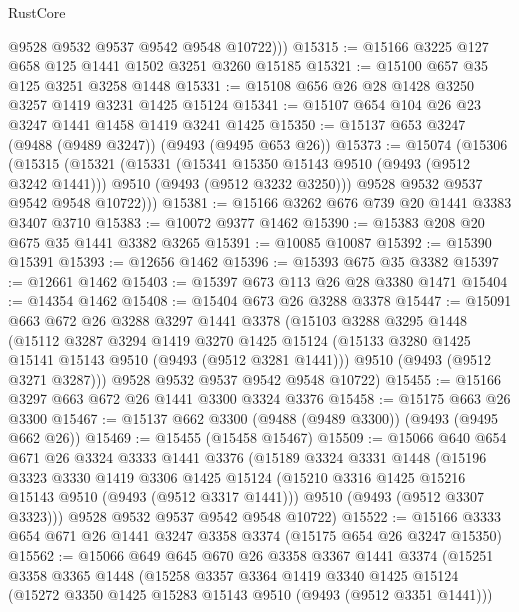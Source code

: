 \begin{lexlean}{RustCore}
\begin{coremodule}
          @9528
          @9532
          @9537
          @9542
          @9548
          @10722)))
@15315 := @15166 @3225 @127 @658 @125 @1441 @1502 @3251 @3260 @15185
@15321 := @15100 @657 @35 @125 @3251 @3258 @1448
@15331 := @15108 @656 @26 @28 @1428 @3250 @3257 @1419 @3231 @1425 @15124
@15341 := @15107 @654 @104 @26 @23 @3247 @1441 @1458 @1419 @3241 @1425
@15350 := @15137 @653 @3247 (@9488 (@9489 @3247)) (@9493 (@9495 @653 @26))
@15373 := @15074
    (@15306
      (@15315
        (@15321
          (@15331
            (@15341 @15350 @15143 @9510 (@9493 (@9512 @3242 @1441)))
            @9510
            (@9493 (@9512 @3232 @3250)))
          @9528
          @9532
          @9537
          @9542
          @9548
          @10722)))
@15381 := @15166 @3262 @676 @739 @20 @1441 @3383 @3407 @3710
@15383 := @10072 @9377 @1462
@15390 := @15383 @208 @20 @675 @35 @1441 @3382 @3265
@15391 := @10085 @10087
@15392 := @15390 @15391
@15393 := @12656 @1462
@15396 := @15393 @675 @35 @3382
@15397 := @12661 @1462
@15403 := @15397 @673 @113 @26 @28 @3380 @1471
@15404 := @14354 @1462
@15408 := @15404 @673 @26 @3288 @3378
@15447 := @15091
    @663
    @672
    @26
    @3288
    @3297
    @1441
    @3378
    (@15103
      @3288
      @3295
      @1448
      (@15112
        @3287
        @3294
        @1419
        @3270
        @1425
        @15124
        (@15133 @3280 @1425 @15141 @15143 @9510 (@9493 (@9512 @3281 @1441)))
        @9510
        (@9493 (@9512 @3271 @3287)))
      @9528
      @9532
      @9537
      @9542
      @9548
      @10722)
@15455 := @15166 @3297 @663 @672 @26 @1441 @3300 @3324 @3376
@15458 := @15175 @663 @26 @3300
@15467 := @15137 @662 @3300 (@9488 (@9489 @3300)) (@9493 (@9495 @662 @26))
@15469 := @15455 (@15458 @15467)
@15509 := @15066
    @640
    @654
    @671
    @26
    @3324
    @3333
    @1441
    @3376
    (@15189
      @3324
      @3331
      @1448
      (@15196
        @3323
        @3330
        @1419
        @3306
        @1425
        @15124
        (@15210 @3316 @1425 @15216 @15143 @9510 (@9493 (@9512 @3317 @1441)))
        @9510
        (@9493 (@9512 @3307 @3323)))
      @9528
      @9532
      @9537
      @9542
      @9548
      @10722)
@15522 := @15166 @3333 @654 @671 @26 @1441 @3247 @3358 @3374 (@15175 @654 @26 @3247 @15350)
@15562 := @15066
    @649
    @645
    @670
    @26
    @3358
    @3367
    @1441
    @3374
    (@15251
      @3358
      @3365
      @1448
      (@15258
        @3357
        @3364
        @1419
        @3340
        @1425
        @15124
        (@15272 @3350 @1425 @15283 @15143 @9510 (@9493 (@9512 @3351 @1441)))

\end{coremodule}
\end{lexlean}
